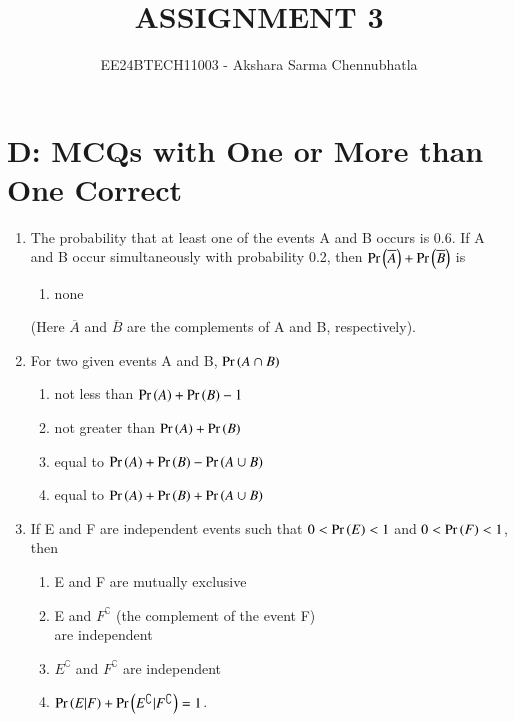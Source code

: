 \documentclass[journal,12pt,onecolumn,article]{IEEEtran}
\theoremstyle{remark}
\begin{document}

\vspace{3cm}
\title{ASSIGNMENT 3}
\author{EE24BTECH11003 - Akshara Sarma Chennubhatla}
\maketitle
\section{D: MCQs with One or More than One Correct}
\begin{enumerate}[start=3]
\item The probability that at least one of the events A and B occurs is 0.6. If A and B occur simultaneously with probability 0.2, then $\Pr\left(\overline{A}\right)+\Pr\left(\overline{B}\right)$ is
\hfill{}
\begin{enumerate}
\item none
\end{enumerate}
(Here $\overline{A}$ and $\overline{B}$ are the complements of A and B, respectively).
\item For two given events A and B, $\Pr\left(A \cap B\right)$
\hfill{}
\begin{enumerate}
\item not less than $\Pr\left(A\right)+\Pr\left(B\right)-1$
\item not greater than $\Pr\left(A\right)+\Pr\left(B\right)$
\item equal to $\Pr\left(A\right)+\Pr\left(B\right)-\Pr\left(A \cup B\right)$
\item equal to $\Pr\left(A\right)+\Pr\left(B\right)+\Pr\left(A \cup B\right)$
\end{enumerate}
\item If E and F are independent events such that $0<\Pr\left(E\right)<1$ and $0<\Pr\left(F\right)<1$, then 
\hfill{}
\begin{enumerate}
\item E and F are mutually exclusive
\item E and $F^\complement$ (the complement of the event F) \\are independent
\item $E^\complement$ and $F^\complement$ are independent
\item $\Pr\left(E|F\right)+\Pr\left(E^\complement|F^\complement\right)=1$.

\end{enumerate}
\end{enumerate}
\end{document}
